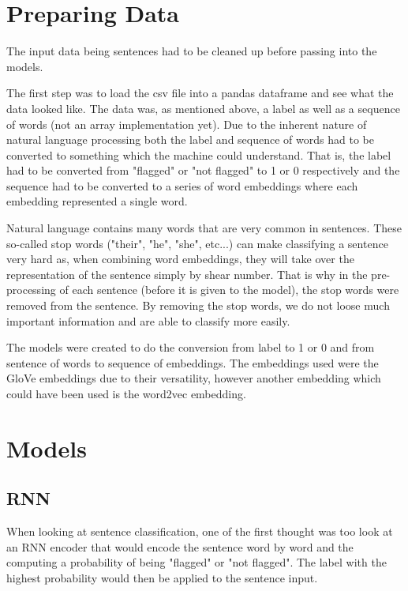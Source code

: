 \documentclass[twoside,twocolumn]{article}
\begin{document}
\section{Preparing Data}
The input data being sentences had to be cleaned up before passing into the models.

The first step was to load the csv file into a pandas dataframe and see what the data looked like.
The data was, as mentioned above, a label as well as a sequence of words (not an array implementation yet).
Due to the inherent nature of natural language processing both the label and sequence of words had to
be converted to something which the machine could understand. That is, the label had to be converted from 
"flagged" or "not flagged" to 1 or 0 respectively and the sequence had to be converted to a series of word
embeddings where each embedding represented a single word.

Natural language contains many words that are very common in sentences. These so-called stop words
 ("their", "he", "she", etc...) can make classifying a sentence very hard as, when combining word
 embeddings, they will take over the representation of the sentence simply by shear number. That is 
 why in the pre-processing of each sentence (before it is given to the model), the stop words were removed
 from the sentence. By removing the stop words, we do not loose much important information and
 are able to classify more easily.

The models were created to do the conversion from label to 1 or 0 and from sentence of words to sequence of embeddings.
The embeddings used were the GloVe embeddings due to their versatility, however another embedding which could have been
used is the word2vec embedding.

\section{Models}

\subsection{RNN}

When looking at sentence classification, one of the first thought was too look at an RNN encoder
that would encode the sentence word by word and the computing a probability of being "flagged"
or "not flagged". The label with the highest probability would then be applied to the sentence input.
\end{document}
